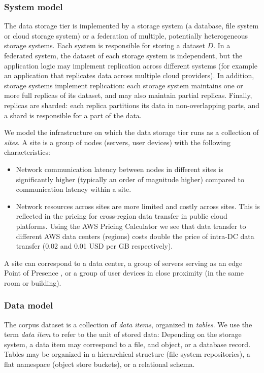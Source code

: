 \subsubsection{System model}
The data storage tier is implemented by a storage system (a database, file system or cloud storage system) or a
federation of multiple, potentially heterogeneous storage systems.
Each system is responsible for storing a dataset $D$.
In a federated system, the dataset of each storage system is independent, but the application logic may implement
replication across different systems (for example an application that replicates data across multiple cloud providers).
In addition, storage systems implement replication:
each storage system maintains one or more full replicas of its dataset, and may also maintain partial replicas.
Finally, replicas are sharded: each replica partitions its data in non-overlapping parts, and a shard is responsible
for a part of the data.

We model the infrastructure on which the data storage tier runs as a collection of \textit{sites}.
A site is a group of nodes (servers, user devices) with the following characteristics:
\begin{itemize}
  \item Network communication latency between nodes in different sites is significantly higher (typically an order of
  magnitude higher) \cite{pbailis:hats} compared to communication latency within a site.
  \item Network resources across sites are more limited and costly across sites.
  This is reflected in the pricing for cross-region data transfer in public cloud platforms.
  Using the AWS Pricing Calculator \cite{aws:costcalc} we see that data transfer to different AWS data centers
  (regions) costs double the price of intra-DC data transfer (0.02 and 0.01 USD per GB respectively).
\end{itemize}

A site can correspond to a data center, a group of servers serving as an edge Point of Presence \cite{google:infra}, or
a group of user devices in close proximity (in the same room or building).


\subsubsection{Data model}
The corpus dataset is a collection of \textit{data items}, organized in \textit{tables}.
We use the term \textit{data item} to refer to the unit of stored data:
Depending on the storage system, a data item may correspond to a file, and object, or a database record.
Tables may be organized in a hierarchical structure (file system repositories), a flat namespace (object store buckets),
or a relational schema.

